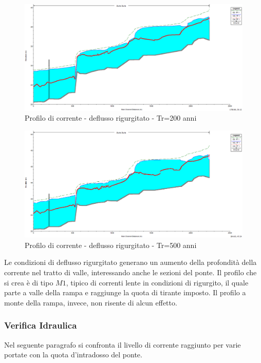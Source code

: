 \documentclass[12pt]{article} %
\begin{document}
\begin{figure}[H]
    \centering
    \includegraphics[scale=0.5]{Prof8.PNG}
    \caption{Profilo di corrente - deflusso rigurgitato - Tr=200 anni}
\end{figure}

\begin{figure}[H]
    \centering
    \includegraphics[scale=0.5]{Prof82.PNG}
    \caption{Profilo di corrente - deflusso rigurgitato - Tr=500 anni}
\end{figure}

\noindent Le condizioni di deflusso rigurgitato generano un aumento della profondità della corrente nel tratto di valle, interessando anche le sezioni del ponte. Il profilo che si crea è di tipo $M1$, tipico di correnti lente in condizioni di rigurgito, il quale parte a valle della rampa e raggiunge la quota di tirante imposto. Il profilo a monte della rampa, invece, non risente di alcun effetto.

\subsubsection{Verifica Idraulica}
\noindent Nel seguente paragrafo si confronta il livello di corrente raggiunto per varie portate con la quota d'intradosso del ponte.
\end{document}
